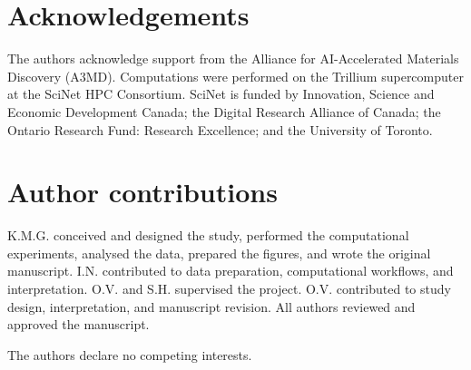 \documentclass[11pt]{article}
\begin{document}



\section*{Acknowledgements}
The authors acknowledge support from the Alliance for AI-Accelerated Materials Discovery (A3MD). Computations were performed on the Trillium supercomputer at the SciNet HPC Consortium. SciNet is funded by Innovation, Science and Economic Development Canada; the Digital Research Alliance of Canada; the Ontario Research Fund: Research Excellence; and the University of Toronto.

\section*{Author contributions}
K.M.G. conceived and designed the study, performed the computational experiments, analysed the data, prepared the figures, and wrote the original manuscript. I.N. contributed to data preparation, computational workflows, and interpretation. O.V. and S.H. supervised the project. O.V. contributed to study design, interpretation, and manuscript revision. All authors reviewed and approved the manuscript.

The authors declare no competing interests.

\clearpage

\end{document}
